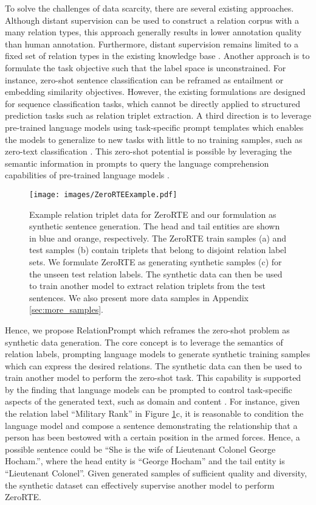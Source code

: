 \documentclass[11pt]{article}
\begin{document}
To solve the challenges of data scarcity, there are several existing approaches.
Although distant supervision \cite{ji2017distant} can be used to construct a relation corpus with a many relation types, this approach generally results in lower annotation quality than human annotation. Furthermore, distant supervision remains limited to a fixed set of relation types in the existing knowledge base \cite{smirnova2018relation}.
Another approach is to formulate the task objective such that the label space is unconstrained.
For instance, zero-shot sentence classification can be reframed as entailment \cite{puri2019zero} or embedding similarity \cite{pushp2017train} objectives.
However, the existing formulations 
are designed for sequence classification tasks, which 
cannot be directly applied to 
structured prediction
tasks such as relation triplet extraction. 
A third direction is to leverage pre-trained language models using task-specific prompt templates \cite{liu2021pre} which enables the models to generalize to new tasks with little to no training samples, such as zero-text classification \cite{zhong2021adapting}.
This zero-shot potential is possible by leveraging the semantic information in prompts to query the language comprehension capabilities of pre-trained language models \cite{radford2019language}.


\begin{figure}[!t]
\centering
\texttt{[image: images/ZeroRTEExample.pdf]}
\caption{
Example relation triplet data for ZeroRTE and our formulation as synthetic sentence generation.
The head and tail entities are shown in blue and orange, respectively.
The ZeroRTE train samples (a) and test samples (b) contain triplets that belong to disjoint relation label sets.
We formulate ZeroRTE as generating synthetic samples (c) for the unseen test relation labels.
The synthetic data can then be used to train another model to extract relation triplets from the test sentences.
We also present more data samples in Appendix \ref{sec:more_samples}.
}
\label{fig:example}
\end{figure}


Hence, we propose RelationPrompt which reframes the zero-shot problem as synthetic data generation.
The core concept is to leverage the semantics of relation labels, prompting language models to generate synthetic training samples which can express the desired relations. 
The synthetic data can then be used to train another model to perform the zero-shot task.
This capability is supported by the finding that language models can be prompted to control task-specific aspects of the generated text, such as domain and content \cite{keskar2019ctrl}.
For instance, given the relation label ``Military Rank'' in Figure \ref{fig:example}c, it is reasonable to condition the language model and compose a sentence demonstrating the relationship
that a person has been bestowed with a certain position in the armed forces.
Hence, a possible sentence could be ``She is the wife of Lieutenant Colonel George Hocham.'', 
where the head entity is ``George Hocham'' and the tail entity is ``Lieutenant Colonel''. 
Given generated samples of sufficient quality and diversity, the synthetic dataset can effectively supervise another model to perform ZeroRTE. 
\end{document}
